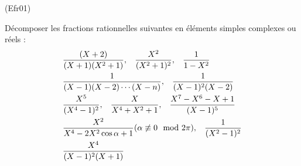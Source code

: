 \begin{tiny}(Efr01)\end{tiny} D{\'e}composer les fractions rationnelles suivantes en éléments simples complexes ou r{\'e}els :
\begin{align*}
&\frac{(X+2)}{(X+1)(X^{2}+1)},\hspace{0.3cm}  \frac{X^2}{(X^2+1)^2},\hspace{0.3cm} \frac{1}{1-X^{2}} \\
&\frac{1}{(X-1)(X-2)\cdots (X-n)},\hspace{0.3cm}  \frac{1}{(X-1)^{2}(X-2)}  \\
&\frac{X^{5}}{(X^{4}-1)^{2}},\hspace{0.3cm} \frac{X}{X^{4}+X^{2}+1},\hspace{0.3cm} \frac{X^{7}-X^{6}-X+1}{(X-1)^{5}}\\
&\frac{X^{2}}{X^{4}-2X^{2}\cos \alpha +1}(\alpha \not \equiv 0 \mod 2\pi),\hspace{0.3cm} \frac{1}{(X^{2}-1)^{2}}\\
&\frac{X^4}{(X-1)^2(X+1)}
\end{align*}
